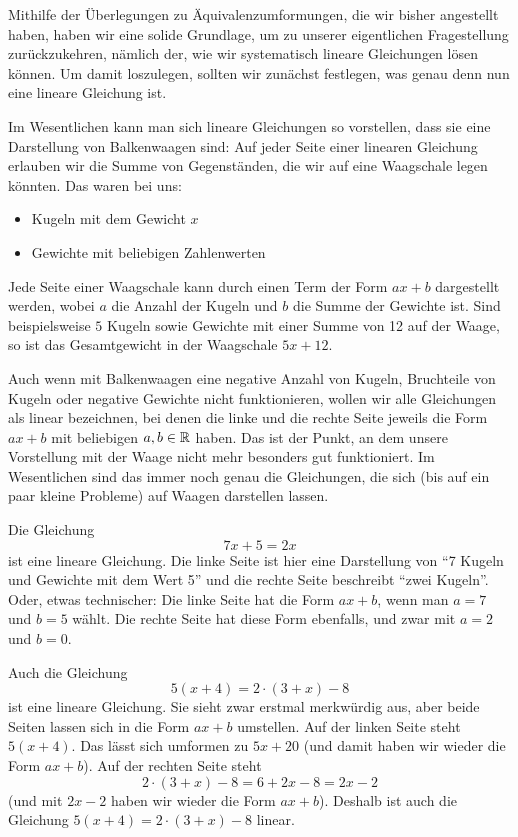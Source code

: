 \documentclass[../../main.tex]{subfiles}
\begin{document}
Mithilfe der Überlegungen zu Äquivalenzumformungen, die wir bisher angestellt haben, haben wir eine solide Grundlage, um zu unserer eigentlichen Fragestellung zurückzukehren, nämlich der, wie wir systematisch lineare Gleichungen lösen können. Um damit loszulegen, sollten wir zunächst festlegen, was genau denn nun eine lineare Gleichung ist.

Im Wesentlichen kann man sich lineare Gleichungen so vorstellen, dass sie eine Darstellung von Balkenwaagen sind: Auf jeder Seite einer linearen Gleichung erlauben wir die Summe von Gegenständen, die wir auf eine Waagschale legen könnten. Das waren bei uns:
\begin{itemize}
    \item Kugeln mit dem Gewicht $x$
    \item Gewichte mit beliebigen Zahlenwerten
\end{itemize}

Jede Seite einer Waagschale kann durch einen Term der Form $ax+b$ dargestellt werden, wobei $a$ die Anzahl der Kugeln und $b$ die Summe der Gewichte ist. Sind beispielsweise $5$ Kugeln sowie Gewichte mit einer Summe von 12 auf der Waage, so ist das Gesamtgewicht in der Waagschale $5x+12$.

Auch wenn mit Balkenwaagen eine negative Anzahl von Kugeln, Bruchteile von Kugeln oder negative Gewichte nicht funktionieren, wollen wir alle Gleichungen als linear bezeichnen, bei denen die linke und die rechte Seite jeweils die Form $ax+b$ mit beliebigen $a,b\in\mathbb{R}$ haben. Das ist der Punkt, an dem unsere Vorstellung mit der Waage nicht mehr besonders gut funktioniert. Im Wesentlichen sind das immer noch genau die Gleichungen, die sich (bis auf ein paar kleine Probleme) auf Waagen darstellen lassen.

\begin{example}{}
    Die Gleichung 
    \[7x+5=2x\] 
    ist eine lineare Gleichung. Die linke Seite ist hier eine Darstellung von \enquote{7 Kugeln und Gewichte mit dem Wert 5} und die rechte Seite beschreibt \enquote{zwei Kugeln}. Oder, etwas technischer: Die linke Seite hat die Form $ax+b$, wenn man $a=7$ und $b=5$ wählt. Die rechte Seite hat diese Form ebenfalls, und zwar mit $a=2$ und $b=0$.
\end{example}
\begin{example}{}
    Auch die Gleichung 
    \[5(x+4)=2\cdot (3+x)-8\] 
    ist eine lineare Gleichung. Sie sieht zwar erstmal merkwürdig aus, aber beide Seiten lassen sich in die Form $ax+b$ umstellen. Auf der linken Seite steht $5(x+4)$. Das lässt sich umformen zu $5x+20$ (und damit haben wir wieder die Form $ax+b$). Auf der rechten Seite steht 
    \[2\cdot (3+x)-8=6+2x-8=2x-2\] 
    (und mit $2x-2$ haben wir wieder die Form $ax+b$). Deshalb ist auch die Gleichung $5(x+4)=2\cdot (3+x)-8$ linear.
\end{example}
\end{document}
